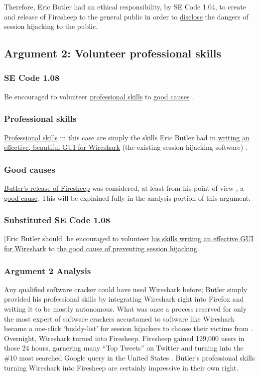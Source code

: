 \documentclass[11pt]{article}
\begin{document}
\begin{multicols}{2}
Therefore, Eric Butler had an ethical responsibility, by SE Code 1.04, to create and release of Firesheep to the general public in order to \uline{disclose} the dangers of session hijacking to the public.


\subsection{Argument 2: Volunteer professional skills}
\subsubsection{SE Code 1.08}
Be encouraged to volunteer \uline{professional skills} to \uline{good causes} \cite{se-code}.

\subsubsection{Professional skills}
\uline{Professional skills} in this case are simply the skills Eric Butler had in \uline{writing an effective, beautiful GUI for Wireshark} (the existing session hijacking software) \cite{wireshark}. 

\subsubsection{Good causes}
\uline{Butler's release of Firesheep} was considered, at least from his point of view \cite{eric-butler}, a \uline{good cause}. This will be explained fully in the analysis portion of this argument.

\subsubsection{Substituted SE Code 1.08}
[Eric Butler should] be encouraged to volunteer \uline{his skills writing an effective GUI for Wireshark} to \uline{the good cause of preventing session hijacking}.

\subsubsection{Argument 2 Analysis}
Any qualified software cracker could have used Wireshark before; Butler simply provided his professional skills by integrating Wireshark right into Firefox and writing it to be mostly autonomous. What was once a process reserved for only the most expert of software crackers accustomed to software like Wireshark became a one-click `buddy-list' for session hijackers to choose their victims from \cite{eric-butler}. Overnight, Wireshark turned into Firesheep. Firesheep gained 129,000 users in those 24 hours, garnering many ``Top Tweets'' on Twitter and turning into the \#10 most searched Google query in the United States \cite{firesheep-day-later}. Butler's professional skills turning Wireshark into Firesheep are certainly impressive in their own right.


\end{multicols}
\end{document}

